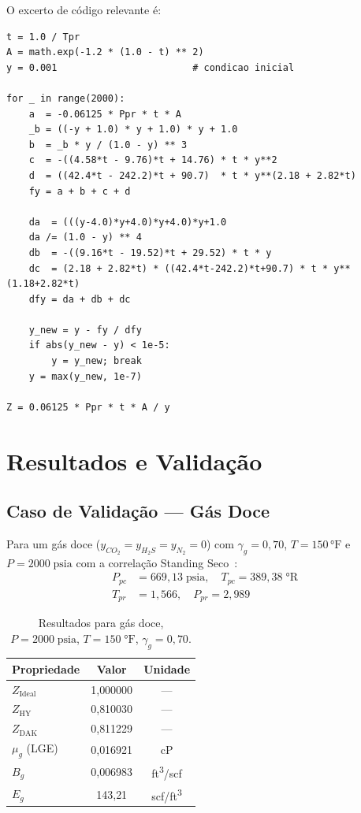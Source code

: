 \documentclass[12pt,a4paper]{article}
\begin{document}
O excerto de código relevante é:
\begin{lstlisting}[caption={Núcleo do método de Newton-Raphson para Hall-Yarborough.},
                   label={lst:newton}]
t = 1.0 / Tpr
A = math.exp(-1.2 * (1.0 - t) ** 2)
y = 0.001                        # condicao inicial

for _ in range(2000):
    a  = -0.06125 * Ppr * t * A
    _b = ((-y + 1.0) * y + 1.0) * y + 1.0
    b  = _b * y / (1.0 - y) ** 3
    c  = -((4.58*t - 9.76)*t + 14.76) * t * y**2
    d  = ((42.4*t - 242.2)*t + 90.7)  * t * y**(2.18 + 2.82*t)
    fy = a + b + c + d

    da  = (((y-4.0)*y+4.0)*y+4.0)*y+1.0
    da /= (1.0 - y) ** 4
    db  = -((9.16*t - 19.52)*t + 29.52) * t * y
    dc  = (2.18 + 2.82*t) * ((42.4*t-242.2)*t+90.7) * t * y**(1.18+2.82*t)
    dfy = da + db + dc

    y_new = y - fy / dfy
    if abs(y_new - y) < 1e-5:
        y = y_new; break
    y = max(y_new, 1e-7)

Z = 0.06125 * Ppr * t * A / y
\end{lstlisting}

\section{Resultados e Validação}

\subsection{Caso de Validação — Gás Doce}

Para um gás doce ($y_{CO_2}=y_{H_2S}=y_{N_2}=0$) com
$\gamma_g=0{,}70$, $T=150\,°\text{F}$ e $P=2000\;\text{psia}$ com
a correlação Standing Seco~\cite{Standing1977}:
\begin{align*}
  P_{pc} &= 669{,}13\;\text{psia}, \quad T_{pc} = 389{,}38\;°\text{R}\\
  T_{pr} &= 1{,}566, \quad P_{pr} = 2{,}989
\end{align*}

\begin{table}[H]
\centering
\caption{Resultados para gás doce, $P=2000\;\text{psia}$, $T=150\;°\text{F}$,
         $\gamma_g=0{,}70$.}
\begin{tabular}{lcc}
\toprule
Propriedade & Valor & Unidade \\
\midrule
$Z_{\text{Ideal}}$   & 1{,}000000 & --- \\
$Z_{\text{HY}}$      & 0{,}810030 & --- \\
$Z_{\text{DAK}}$     & 0{,}811229 & --- \\
$\mu_g$ (LGE)        & 0{,}016921 & cP \\
$B_g$                & 0{,}006983 & ft\textsuperscript{3}/scf \\
$E_g$                & 143{,}21   & scf/ft\textsuperscript{3} \\
\bottomrule
\end{tabular}
\label{tab:val_doce}
\end{table}
\end{document}
